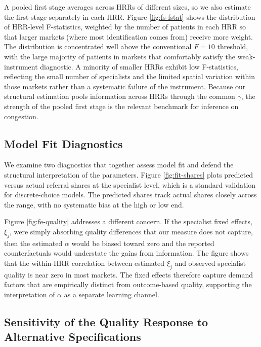 \documentclass[12pt]{article}
\begin{document}
A pooled first stage averages across HRRs of different sizes, so we also estimate the first stage separately in each HRR. Figure \ref{fig:fs-fstat} shows the distribution of HRR-level F-statistics, weighted by the number of patients in each HRR so that larger markets (where most identification comes from) receive more weight. The distribution is concentrated well above the conventional $F = 10$ threshold, with the large majority of patients in markets that comfortably satisfy the weak-instrument diagnostic. A minority of smaller HRRs exhibit low F-statistics, reflecting the small number of specialists and the limited spatial variation within those markets rather than a systematic failure of the instrument. Because our structural estimation pools information across HRRs through the common $\gamma$, the strength of the pooled first stage is the relevant benchmark for inference on congestion.



\subsection{Model Fit Diagnostics}
\label{app:fit}

We examine two diagnostics that together assess model fit and defend the structural interpretation of the parameters. Figure \ref{fig:fit-shares} plots predicted versus actual referral shares at the specialist level, which is a standard validation for discrete-choice models. The predicted shares track actual shares closely across the range, with no systematic bias at the high or low end.

Figure \ref{fig:fe-quality} addresses a different concern. If the specialist fixed effects, $\xi_j$, were simply absorbing quality differences that our measure does not capture, then the estimated $\alpha$ would be biased toward zero and the reported counterfactuals would understate the gains from information. The figure shows that the within-HRR correlation between estimated $\xi_j$ and observed specialist quality is near zero in most markets. The fixed effects therefore capture demand factors that are empirically distinct from outcome-based quality, supporting the interpretation of $\alpha$ as a separate learning channel.



\subsection{Sensitivity of the Quality Response to Alternative Specifications}
\label{app:alpha-sensitivity}
\end{document}
